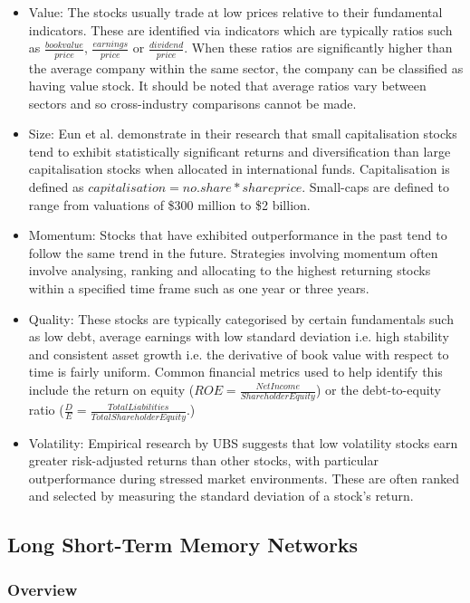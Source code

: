 \documentclass[10pt,onecolumn,letterpaper]{article}
\begin{document}
\begin{itemize}
	\item Value: The stocks usually trade at low prices relative to their fundamental indicators. These are identified via indicators which are typically ratios such as $\frac{bookvalue}{price}$, $\frac{earnings}{price}$ or $\frac{dividend}{price}$. When these ratios are significantly higher than the average company within the same sector, the company can be classified as having value stock. It should be noted that average ratios vary between sectors and so cross-industry comparisons cannot be made. 
	\item Size: Eun et al. demonstrate in their research\cite{Eun} that small capitalisation stocks tend to exhibit statistically significant returns and diversification than large capitalisation stocks when allocated in international funds. Capitalisation is defined as $capitalisation = no.share * share price$. Small-caps are defined to range from valuations of \$300 million to \$2 billion. 
	\item Momentum: Stocks that have exhibited outperformance in the past tend to follow the same trend in the future. Strategies involving momentum often involve analysing, ranking and allocating to the highest returning stocks within a specified time frame such as one year or three years. 
	\item Quality: These stocks are typically categorised by certain fundamentals such as low debt, average earnings with low standard deviation i.e. high stability and consistent asset growth i.e. the derivative of book value with respect to time is fairly uniform. Common financial metrics used to help identify this include the return on equity ($ROE = \frac{NetIncome}{ShareholderEquity}$) or the debt-to-equity ratio ($\frac{D}{E} = \frac{Total Liabilities}{Total Shareholder Equity}$.)
	\item Volatility: Empirical research by UBS\cite{Merz} suggests that low volatility stocks earn greater risk-adjusted returns than other stocks, with particular outperformance during stressed market environments. These are often ranked and selected by measuring the standard deviation of a stock's return. 
\end{itemize}

\subsection{Long Short-Term Memory Networks} \label{lstm}

\subsubsection{Overview} 
\end{document}
